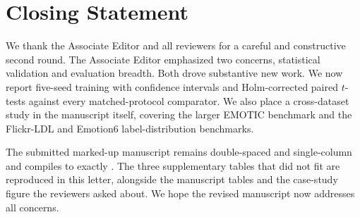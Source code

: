 \section{Closing Statement}

We thank the Associate Editor and all reviewers for a careful and constructive second round. The Associate Editor emphasized two concerns, statistical validation and evaluation breadth. Both drove substantive new work. We now report five-seed training with confidence intervals and Holm-corrected paired $t$-tests against every matched-protocol comparator. We also place a cross-dataset study in the manuscript itself, covering the larger EMOTIC benchmark and the Flickr-LDL and Emotion6 label-distribution benchmarks.

The submitted marked-up manuscript remains double-spaced and single-column and compiles to exactly . The three supplementary tables that did not fit are reproduced in this letter, alongside the manuscript tables and the case-study figure the reviewers asked about. We hope the revised manuscript now addresses all concerns.
